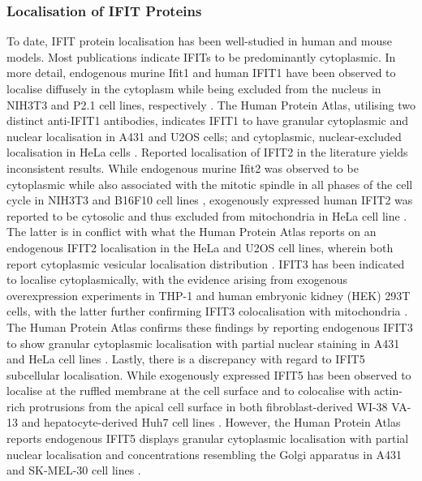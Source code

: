 \subsubsection{Localisation of IFIT Proteins} \label{Localisation of IFIT Proteins}
To date, IFIT protein localisation has been well-studied in human and mouse models. Most publications indicate IFITs to be predominantly cytoplasmic. In more detail, endogenous murine Ifit1 and human IFIT1 have been observed to localise diffusely in the cytoplasm while being excluded from the nucleus in NIH3T3 and P2.1 cell lines, respectively \cite{Pichlmair2011IFIT1RNA, Terenzi2008Interferon-inducibleE1}. The Human Protein Atlas, utilising two distinct anti-IFIT1 antibodies, indicates IFIT1 to have granular cytoplasmic and nuclear localisation in A431 and U2OS cells; and cytoplasmic, nuclear-excluded localisation in HeLa cells \cite{Thul2017AProteome}. Reported localisation of IFIT2 in the literature yields inconsistent results. While endogenous murine Ifit2 was observed to be cytoplasmic while also associated with the mitotic spindle in all phases of the cell cycle in NIH3T3 and B16F10 cell lines \cite{Saha2006IdentificationProtein}, exogenously expressed human IFIT2 was reported to be cytosolic and thus excluded from mitochondria in HeLa cell line \cite{Stawowczyk2011TheApoptosis}. The latter is in conflict with what the Human Protein Atlas reports on an endogenous IFIT2 localisation in the HeLa and U2OS cell lines, wherein both report cytoplasmic vesicular localisation distribution \cite{Thul2017AProteome}. IFIT3 has been indicated to localise cytoplasmically, with the evidence arising from exogenous overexpression experiments in THP-1 and human embryonic kidney (HEK) 293T cells, with the latter further confirming IFIT3 colocalisation with mitochondria \cite{Huang2008Interferon-inducedCells, Liu2011IFN-InducedTBK1}. The Human Protein Atlas confirms these findings by reporting endogenous IFIT3 to show granular cytoplasmic localisation with partial nuclear staining in A431 and HeLa cell lines \cite{Thul2017AProteome}. Lastly, there is a discrepancy with regard to IFIT5 subcellular localisation. While exogenously expressed IFIT5 has been observed to localise at the ruffled membrane at the cell surface and to colocalise with actin-rich protrusions from the apical cell surface in both fibroblast-derived WI-38 VA-13 and hepatocyte-derived Huh7 cell lines \cite{Katibah2013TRNAIFIT5}. However, the Human Protein Atlas reports endogenous IFIT5 displays granular cytoplasmic localisation with partial nuclear localisation and concentrations resembling the Golgi apparatus in A431 and SK-MEL-30 cell lines \cite{Thul2017AProteome}. 

